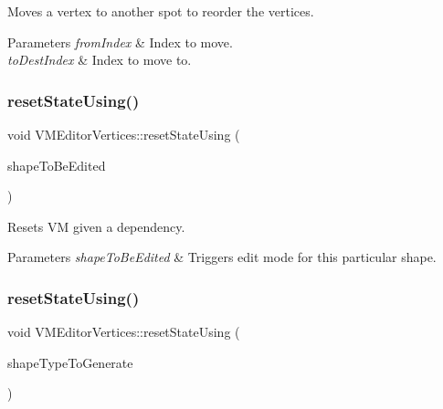 Moves a vertex to another spot to reorder the vertices. 


\begin{DoxyParams}{Parameters}
{\em from\+Index} & Index to move. \\
\hline
{\em to\+Dest\+Index} & Index to move to. \\
\hline
\end{DoxyParams}
\mbox{\label{class_v_m_editor_vertices_ada7b06ed4146f561c1472148a994a871}} 
\subsubsection{\texorpdfstring{resetStateUsing()}{resetStateUsing()}\hspace{0.1cm}{\footnotesize\ttfamily [1/2]}}
{\footnotesize\ttfamily void V\+M\+Editor\+Vertices\+::reset\+State\+Using (\begin{DoxyParamCaption}\item[{\mbox{\hyperlink{class_i_shape}{I\+Shape}} $\ast$}]{shape\+To\+Be\+Edited }\end{DoxyParamCaption})}



Resets VM given a dependency. 


\begin{DoxyParams}{Parameters}
{\em shape\+To\+Be\+Edited} & Triggers edit mode for this particular shape. \\
\hline
\end{DoxyParams}
\mbox{\label{class_v_m_editor_vertices_abe3cb316fd9c1751b0163ab137c01148}} 
\subsubsection{\texorpdfstring{resetStateUsing()}{resetStateUsing()}\hspace{0.1cm}{\footnotesize\ttfamily [2/2]}}
{\footnotesize\ttfamily void V\+M\+Editor\+Vertices\+::reset\+State\+Using (\begin{DoxyParamCaption}\item[{\mbox{\hyperlink{class_i_shape_a8f50993477b5ddb44c0547ef3d547cdc}{I\+Shape\+::\+Shape\+Type}}}]{shape\+Type\+To\+Generate }\end{DoxyParamCaption})}



